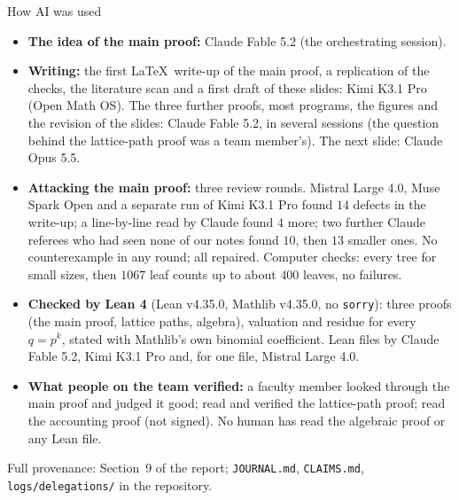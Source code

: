 \documentclass[aspectratio=169,11pt]{beamer}
\begin{document}
\begin{frame}{How AI was used}
  \footnotesize
  \begin{itemize}\setlength{\itemsep}{2pt}
    \item \textbf{The idea of the main proof:} Claude Fable 5.2 (the orchestrating session).
    \item \textbf{Writing:} the first \LaTeX\ write-up of the main proof, a replication of the checks, the
      literature scan and a first draft of these slides: Kimi K3.1 Pro (Open Math OS). The three further
      proofs, most programs, the figures and the revision of the slides: Claude Fable 5.2, in several
      sessions (the question behind the lattice-path proof was a team member's). The next slide:
      Claude Opus 5.5.
    \item \textbf{Attacking the main proof:} three review rounds. Mistral Large 4.0, Muse Spark Open
      and a separate run of Kimi K3.1 Pro found $14$ defects in the write-up; a line-by-line
      read by Claude found $4$ more; two further Claude referees who had seen none
      of our notes found $10$, then $13$ smaller ones. No counterexample in any round; all
      repaired. Computer checks: every tree for small sizes, then $1067$ leaf counts
      up to about $400$ leaves, no failures.
    \item \textbf{Checked by Lean 4} (Lean v4.35.0, Mathlib v4.35.0, no \texttt{sorry}): three proofs (the
      main proof, lattice paths, algebra), valuation and residue for every $q=p^k$, stated with Mathlib's
      own binomial coefficient. Lean files by Claude Fable 5.2, Kimi K3.1 Pro and, for one file,
      Mistral Large 4.0.
    \item \textbf{What people on the team verified:} a faculty member looked through the main proof and
      judged it good; read and verified the lattice-path proof; read the accounting proof (not signed).
      No human has read the algebraic proof or any Lean file.
  \end{itemize}
  \vfill
  {\scriptsize Full provenance: Section~9 of the report; \texttt{JOURNAL.md}, \texttt{CLAIMS.md},
  \texttt{logs/delegations/} in the repository.}
\end{frame}
\end{document}
